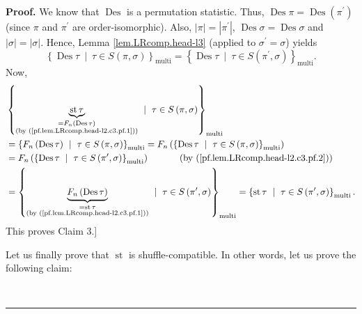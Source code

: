 \documentclass[numbers=enddot,12pt,final,onecolumn,notitlepage]{scrartcl}%
\theoremstyle{definition}
\newenvironment{proof}[1][Proof]{\noindent\textbf{#1.} }{\ \rule{0.5em}{0.5em}}
\newenvironment{verlong}{}{}
\begin{document}
\begin{verlong}
\begin{proof}
We know that $\operatorname{Des}$ is a permutation statistic. Thus,
$\operatorname{Des}\pi=\operatorname{Des}\left(  \pi^{\prime}\right)  $
(since $\pi$ and $\pi^{\prime}$ are order-isomorphic). Also, $\left\vert
\pi\right\vert =\left\vert \pi^{\prime}\right\vert $, $\operatorname{Des}
\sigma=\operatorname{Des}\sigma$ and $\left\vert \sigma\right\vert
=\left\vert \sigma\right\vert $. Hence, Lemma \ref{lem.LRcomp.head-l3}
(applied to $\sigma^{\prime}=\sigma$) yields
\begin{equation}
\left\{  \operatorname{Des}\tau\ \mid\ \tau\in S\left(  \pi,\sigma\right)
\right\}  _{\operatorname*{multi}}=\left\{  \operatorname{Des}\tau
\ \mid\ \tau\in S\left(  \pi^{\prime},\sigma\right)  \right\}
_{\operatorname*{multi}}. \label{pf.lem.LRcomp.head-l2.c3.pf.2}%
\end{equation}
Now,
\begin{align*}
&  \left\{  \underbrace{\operatorname{st} \tau   }%
_{\substack{=F_{n}\left(  \operatorname{Des}\tau\right)  \\\text{(by
(\ref{pf.lem.LRcomp.head-l2.c3.pf.1}))}}}\ \mid\ \tau\in S\left(  \pi
,\sigma\right)  \right\}  _{\operatorname*{multi}}\\
&  =\left\{  F_{n}\left(  \operatorname{Des}\tau\right)  \ \mid\ \tau\in
S\left(  \pi,\sigma\right)  \right\}  _{\operatorname*{multi}}=F_{n}\left(
\left\{  \operatorname{Des}\tau\ \mid\ \tau\in S\left(  \pi,\sigma\right)
\right\}  _{\operatorname*{multi}}\right) \\
&  =F_{n}\left(  \left\{  \operatorname{Des}\tau\ \mid\ \tau\in S\left(
\pi^{\prime},\sigma\right)  \right\}  _{\operatorname*{multi}}\right)
\ \ \ \ \ \ \ \ \ \ \left(  \text{by (\ref{pf.lem.LRcomp.head-l2.c3.pf.2}%
)}\right) \\
&  =\left\{  \underbrace{F_{n}\left(  \operatorname{Des}\tau\right)
}_{\substack{=\operatorname{st} \tau   \\\text{(by
(\ref{pf.lem.LRcomp.head-l2.c3.pf.1}))}}}\ \mid\ \tau\in S\left(  \pi^{\prime
},\sigma\right)  \right\}  _{\operatorname*{multi}}=\left\{
\operatorname{st} \tau   \ \mid\ \tau\in S\left(  \pi^{\prime
},\sigma\right)  \right\}  _{\operatorname*{multi}}.
\end{align*}
This proves Claim 3.]

Let us finally prove that $\operatorname{st}$ is shuffle-compatible. In other
words, let us prove the following claim:


\end{proof}
\end{verlong}
\end{document}
